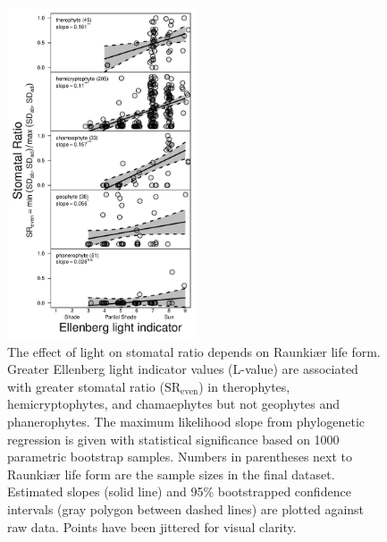 \documentclass[12pt, oneside]{article}
\newcommand{\el}{L-value}
\begin{document}
\begin{figure}[ht]
\centerline{\includegraphics[width=0.5\textwidth]{figures/figure_SRmultReg.pdf}}
\caption{The effect of light on stomatal ratio depends on Raunki\ae r life form. Greater Ellenberg light indicator values (\el) are associated with greater stomatal ratio ($\mathrm{SR_{even}}$) in therophytes, hemicryptophytes, and chamaephytes but not geophytes and phanerophytes. The maximum likelihood slope from phylogenetic regression is given with statistical significance based on 1000 parametric bootstrap samples. Numbers in parentheses next to Raunki\ae r life form are the sample sizes in the final dataset. Estimated slopes (solid line) and 95\% bootstrapped confidence intervals (gray polygon between dashed lines) are plotted against raw data. Points have been jittered for visual clarity.} 
\label{fig:SRmultReg}
\end{figure}
\end{document}
